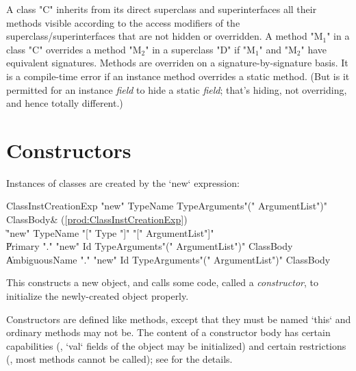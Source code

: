A class \xcd"C" inherits from its direct superclass and superinterfaces all
their methods visible according to the access modifiers
of the superclass/superinterfaces that are not hidden or overridden. A method \xcdmath"M$_1$" in a class
\xcd"C" overrides
a method \xcdmath"M$_2$" in a superclass \xcd"D" if
\xcdmath"M$_1$" and \xcdmath"M$_2$" have equivalent signatures.
Methods are overriden on a signature-by-signature basis.  It is a compile-time
error if an instance method overrides a static method.  (But is it permitted
for an instance {\em field} to hide a static {\em field}; that's hiding, not
overriding, and hence totally different.)

\section{Constructors}
\label{sect:constructors}

Instances of classes are created by the \xcd`new` expression: \\
\begin{bbgrammar}
ClassInstCreationExp \: \xcd"new" TypeName TypeArguments\opt \xcd"(" ArgumentList\opt \xcd")" ClassBody\opt & (\ref{prod:ClassInstCreationExp}) \\
                    \| \xcd"new" TypeName \xcd"[" Type \xcd"]" \xcd"[" ArgumentList\opt \xcd"]" \\
                    \| Primary \xcd"." \xcd"new" Id TypeArguments\opt \xcd"(" ArgumentList\opt \xcd")" ClassBody\opt \\
                    \| AmbiguousName \xcd"." \xcd"new" Id TypeArguments\opt \xcd"(" ArgumentList\opt \xcd")" ClassBody\opt \\
\end{bbgrammar}

This constructs a new object, and calls some code, called a {\em constructor},
to initialize the newly-created object properly.

Constructors are defined like methods, except that they must be named \xcd`this`
and ordinary methods may not be.    The content of a constructor body has
certain capabilities (\eg, \xcd`val` fields of the object may be initialized)
and certain restrictions (\eg, most methods cannot be called); see
 for the details.

